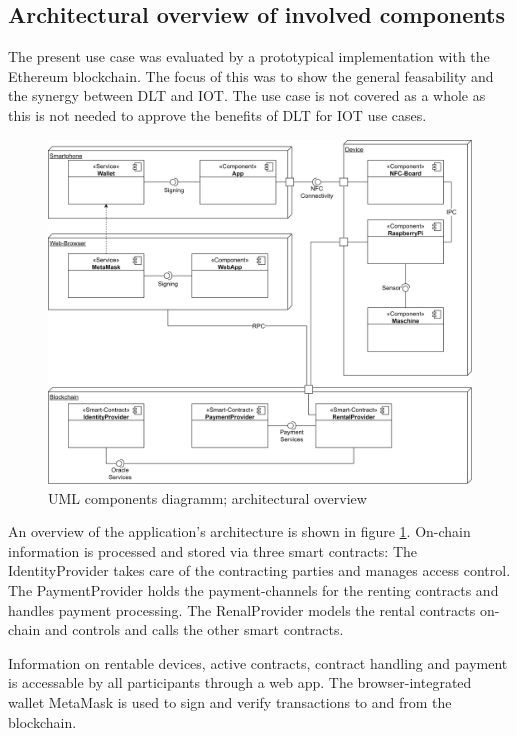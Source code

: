 \documentclass[conference]{IEEEtran}
\begin{document}
\subsection{Architectural overview of involved components}
The present use case was evaluated by a prototypical implementation with the Ethereum blockchain. The focus of this was to show the general feasability and the synergy between DLT and IOT. The use case is not covered as a whole as this is not needed to approve the benefits of DLT for IOT use cases.

\begin{figure}[hbt]
 \centering
 \includegraphics[width=1.0\textwidth]{media/Architecture.png}
 \caption{UML components diagramm; architectural overview}
 \label{fig:architecture}
\end{figure}

An overview of the application's architecture is shown in figure \ref{fig:architecture}. On-chain information is processed and stored via three smart contracts: The IdentityProvider takes care of the contracting parties and manages access control. The PaymentProvider holds the payment-channels for the renting contracts and handles payment processing. The RenalProvider models the rental contracts on-chain and controls and calls the other smart contracts.

Information on rentable devices, active contracts, contract handling and payment is accessable by all participants through a web app. The browser-integrated wallet MetaMask is used to sign and verify transactions to and from the blockchain.
\end{document}

